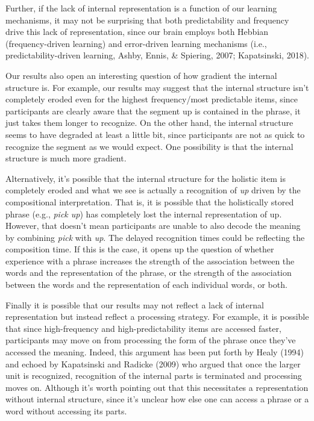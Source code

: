 \documentclass[
  man,floatsintext]{apa6}
\begin{document}
Further, if the lack of internal representation is a function of our learning mechanisms, it may not be surprising that both predictability and frequency drive this lack of representation, since our brain employs both Hebbian (frequency-driven learning) and error-driven learning mechanisms (i.e., predictability-driven learning, Ashby, Ennis, \& Spiering, 2007; Kapatsinski, 2018).

Our results also open an interesting question of how gradient the internal structure is. For example, our results may suggest that the internal structure isn't completely eroded even for the highest frequency/most predictable items, since participants are clearly aware that the segment up is contained in the phrase, it just takes them longer to recognize. On the other hand, the internal structure seems to have degraded at least a little bit, since participants are not as quick to recognize the segment as we would expect. One possibility is that the internal structure is much more gradient.

Alternatively, it's possible that the internal structure for the holistic item is completely eroded and what we see is actually a recognition of \emph{up} driven by the compositional interpretation. That is, it is possible that the holistically stored phrase (e.g., \emph{pick up}) has completely lost the internal representation of up. However, that doesn't mean participants are unable to also decode the meaning by combining \emph{pick} with \emph{up}. The delayed recognition times could be reflecting the composition time. If this is the case, it opens up the question of whether experience with a phrase increases the strength of the association between the words and the representation of the phrase, or the strength of the association between the words and the representation of each individual words, or both.

Finally it is possible that our results may not reflect a lack of internal representation but instead reflect a processing strategy. For example, it is possible that since high-frequency and high-predictability items are accessed faster, participants may move on from processing the form of the phrase once they've accessed the meaning. Indeed, this argument has been put forth by Healy (1994) and echoed by Kapatsinski and Radicke (2009) who argued that once the larger unit is recognized, recognition of the internal parts is terminated and processing moves on. Although it's worth pointing out that this necessitates a representation without internal structure, since it's unclear how else one can access a phrase or a word without accessing its parts.
\end{document}
